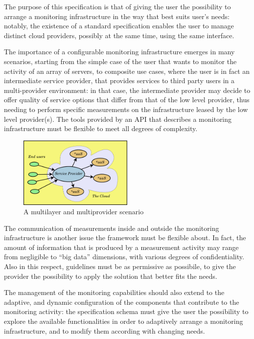 \documentclass[10pt]{article}  %
\begin{document}
The purpose of this specification is that of giving the user the possibility to arrange a monitoring infrastructure in the way that best suits user's needs: notably, the existence of a standard specification enables the user to manage distinct cloud providers, possibly at the same time, using the same interface.

The importance of a configurable monitoring infrastructure emerges in many scenarios, starting from the simple case of the user that wants to monitor the activity of an array of servers, to composite use cases, where the user is in fact an intermediate service provider, that provides services to third party users in a multi-provider environment: in that case, the intermediate provider may decide to offer quality of service options that differ from that of the low level provider, thus needing to perform specific measurements on the infrastructure leased by the low level provider(s). The tools provided by an API that describes a monitoring infrastructure must be flexible to meet all degrees of complexity.

\begin{figure}[b]
\centering
\includegraphics[width=0.5\textwidth]{img/multilayer.pdf}
\caption{A multilayer and multiprovider scenario \label{img:scenario}}
\end{figure}

The communication of measurements inside and outside the monitoring infrastructure is another issue the framework must be flexible about. In fact, the amount of information that is produced by a measurement activity may range from negligible to ``big data'' dimensions, with various degrees of confidentiality. Also in this respect, guidelines must be as permissive as possibile, to give the provider the possibility to apply the solution that better fits the needs.

The management of the monitoring capabilities should also extend to the adaptive, and dynamic configuration of the components that contribute to the monitoring activity: the specification schema must give the user the possibility to explore the available functionalities in order to adaptively arrange a monitoring infrastructure, and to modify them according with changing needs.
\end{document}

